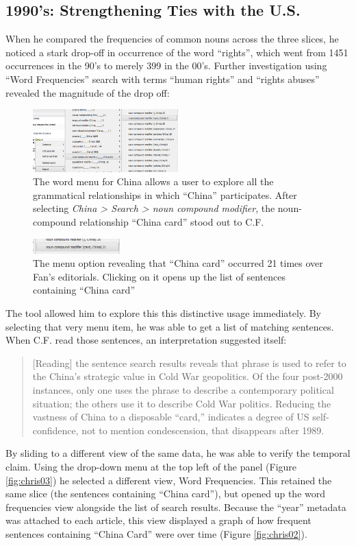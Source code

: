 \documentclass{sig-alternate}
\begin{document}
\subsection{1990's: Strengthening Ties with the U.S.}
When he compared the frequencies of common nouns across the three slices, he noticed a stark drop-off in occurrence of the word ``rights'', which went from 1451 occurrences in the 90's to merely 399 in the 00's. Further investigation using ``Word Frequencies'' search with terms ``human rights'' and ``rights abuses'' revealed the magnitude of the drop off:



\begin{figure}[h!]
\includegraphics[width=0.5\textwidth]{fig/chris/01.png}
\caption{The word menu for China allows a user to explore all the grammatical relationships in which ``China'' participates.   After selecting \emph{China > Search > noun compound modifier}, the noun-compound relationship ``China card'' stood out to C.F. \label{fig:chris01}}
\end{figure}

\begin{figure}[h!]
\includegraphics[width=0.3\textwidth]{fig/chris/01b.png}
\caption{ The menu option revealing that ``China card'' occurred 21 times over Fan's editorials. Clicking on it opens up the list of sentences containing ``China card''  \label{fig:chris01b}}
\end{figure}

The tool allowed him to explore this this distinctive usage immediately. By selecting that very menu item, he was able to get a list of matching sentences. When C.F. read those sentences, an interpretation suggested itself:
\begin{quote}[Reading] the sentence search results reveals that phrase is used to refer to the China's strategic value in Cold War geopolitics. Of the four post-2000 instances, only one uses the phrase to describe a contemporary political situation; the others use it to describe Cold War politics. Reducing the vastness of China to a disposable ``card,'' indicates a degree of US self-confidence, not to mention condescension, that disappears after 1989.\end{quote}
By sliding to a different view of the same data, he was able to verify the temporal claim. Using the drop-down menu at the top left of the panel (Figure \ref{fig:chris03}) he selected a different view, Word Frequencies. This retained the same slice (the sentences containing ``China card''), but opened up the word frequencies view alongside the list of search results.  Because the ``year'' metadata was attached to each article, this view displayed a graph of how frequent  sentences containing ``China Card'' were over time (Figure \ref{fig:chris02}). 
\end{document}
